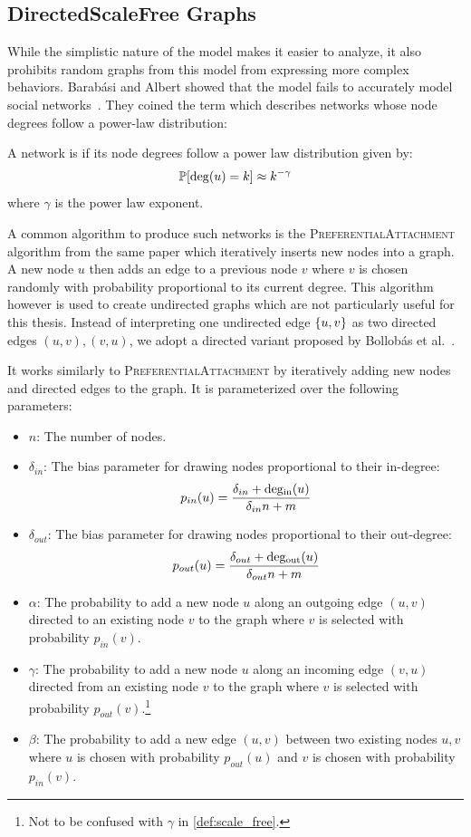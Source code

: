 \subsection{DirectedScaleFree Graphs}\label{sec:dsf}
While the simplistic nature of the \Gnp model makes it easier to analyze, it also prohibits random graphs from this model from expressing more complex behaviors.
Barabási and Albert showed that the \Gnp model fails to accurately model social networks~\cite{ScaleFreeBA}.
They coined the term  which describes networks whose node degrees follow a power-law distribution:

\begin{definition}\label{def:scale_free}
  A network is  if its node degrees follow a power law distribution given by: \[
    \mathbb P\!\left[\mathrm{deg}(u) = k\right] \approx k^{-\gamma}
  \] where $\gamma$ is the power law exponent.
\end{definition}

A common algorithm to produce such networks is the \textsc{PreferentialAttachment} algorithm from the same paper which iteratively inserts new nodes into a graph.
A new node $u$ then adds an edge to a previous node $v$ where $v$ is chosen randomly with probability proportional to its current degree.
This algorithm however is used to create undirected graphs which are not particularly useful for this thesis.
Instead of interpreting one undirected edge $\left\{u, v\right\}$ as two directed edges $(u, v), (v, u)$, we adopt a directed variant proposed by Bollobás et al.~\cite{DBLP:conf/soda/BollobasBCR03}.

It works similarly to \textsc{PreferentialAttachment} by iteratively adding new nodes and directed edges to the graph.
It is parameterized over the following parameters: 
\begin{itemize}
  \item $n$: The number of nodes.
  \item $\delta_{in}$: The bias parameter for drawing nodes proportional to their in-degree: \[
      p_{in}(u) = \frac{\delta_{in} + \mathrm{deg_{in}}(u)}{\delta_{in}n + m}
  \]
  \item $\delta_{out}$: The bias parameter for drawing nodes proportional to their out-degree: \[
      p_{out}(u) = \frac{\delta_{out} + \mathrm{deg_{out}}(u)}{\delta_{out}n + m}
  \]
  \item $\alpha$: The probability to add a new node $u$ along an outgoing edge $(u, v)$ directed to an existing node $v$ to the graph where $v$ is selected with probability $p_{in}(v)$. 
  \item $\gamma$: The probability to add a new node $u$ along an incoming edge $(v, u)$ directed from an existing node $v$ to the graph where $v$ is selected with probability $p_{out}(v)$.\footnote{
    Not to be confused with $\gamma$ in \cref{def:scale_free}.
  }
  \item $\beta$: The probability to add a new edge $(u, v)$ between two existing nodes $u, v$ where $u$ is chosen with probability $p_{out}(u)$ and $v$ is chosen with probability $p_{in}(v)$.
\end{itemize}


